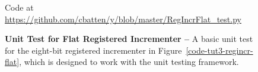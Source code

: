 
\begin{figure}

  

  \centerline{\small Code at
    \url{https://github.com/cbatten/y/blob/master/RegIncrFlat_test.py}}

  \caption{\textbf{Unit Test for Flat Registered Incrementer --} A basic
    unit test for the eight-bit registered incrementer in
    Figure~\ref{code-tut3-regincr-flat}, which is designed to work with
    the  unit testing framework.}
  \label{code-tut3-regincr-flat-test}

\end{figure}

